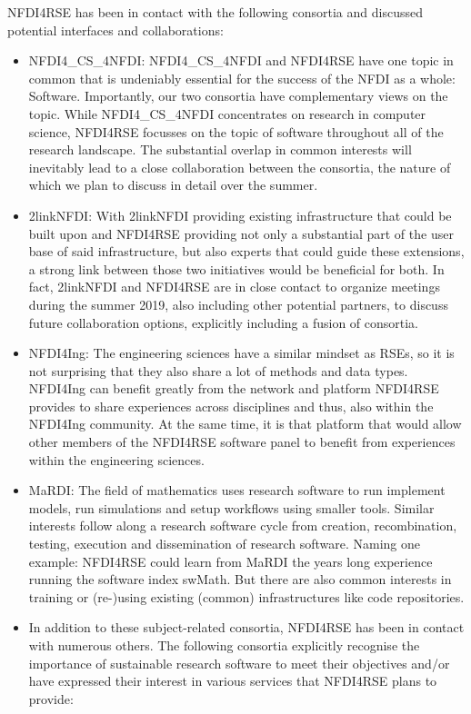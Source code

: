\documentclass[11pt,a4paper]{scrlttr2}
\begin{document}
\begin{letter}{}
NFDI4RSE has been in contact with the following consortia and discussed potential interfaces and collaborations:
\begin{itemize}
 \setlength\itemsep{-.5em}
\item NFDI4\_CS\_4NFDI: NFDI4\_CS\_4NFDI and NFDI4RSE have one topic in common that is undeniably essential for the success of the NFDI as a whole: Software. Importantly, our two consortia have complementary views on the topic. While NFDI4\_CS\_4NFDI concentrates on research in computer science, NFDI4RSE focusses on the topic of software throughout all of the research landscape. The substantial overlap in common interests will inevitably lead to a close collaboration between the consortia, the nature of which we plan to discuss in detail over the summer. 
\item 2linkNFDI: With 2linkNFDI providing existing infrastructure that could be built upon and NFDI4RSE providing not only a substantial part of the user base of said infrastructure, but also experts that could guide these extensions, a strong link between those two initiatives would be beneficial for both. In fact, 2linkNFDI and NFDI4RSE are in close contact to organize meetings during the summer 2019, also including other potential partners, to discuss future collaboration options, explicitly including a fusion of consortia.
\item NFDI4Ing: The engineering sciences have a similar mindset as RSEs, so it is not surprising that they also share a lot of methods and data types. NFDI4Ing can benefit greatly from the network and platform NFDI4RSE provides to share experiences across disciplines and thus, also within the NFDI4Ing community. At the same time, it is that platform that would allow other members of the NFDI4RSE software panel to benefit from experiences within the engineering sciences.
\item MaRDI: The field of mathematics uses research software to run implement models, run simulations and setup workflows using smaller tools. Similar interests follow along a research software cycle from creation, recombination, testing, execution and dissemination of research software. Naming one example: NFDI4RSE could learn from MaRDI the years long experience running the software index swMath. But there are also common interests in training or (re-)using existing (common) infrastructures like code repositories. 
\item In addition to these subject-related consortia, NFDI4RSE has been in contact with numerous others. The following consortia explicitly recognise the importance of sustainable research software to meet their objectives and/or have expressed their interest in various services that NFDI4RSE plans to provide:

\end{itemize}
\end{letter}
\end{document}
